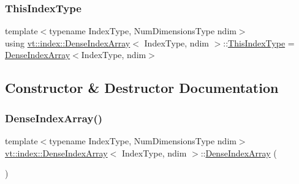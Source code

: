 \mbox{\label{structvt_1_1index_1_1_dense_index_array_a6915511f6a82dff2522d6e8c2be20f2a}} 
\subsubsection{\texorpdfstring{This\+Index\+Type}{ThisIndexType}}
{\footnotesize\ttfamily template$<$typename Index\+Type, Num\+Dimensions\+Type ndim$>$ \\
using \hyperlink{structvt_1_1index_1_1_dense_index_array}{vt\+::index\+::\+Dense\+Index\+Array}$<$ Index\+Type, ndim $>$\+::\hyperlink{structvt_1_1index_1_1_dense_index_array_a6915511f6a82dff2522d6e8c2be20f2a}{This\+Index\+Type} =  \hyperlink{structvt_1_1index_1_1_dense_index_array}{Dense\+Index\+Array}$<$Index\+Type, ndim$>$}



\subsection{Constructor \& Destructor Documentation}
\mbox{\label{structvt_1_1index_1_1_dense_index_array_afcd3d27f0c86b6c37540ae78f9afc2d1}} 
\subsubsection{\texorpdfstring{Dense\+Index\+Array()}{DenseIndexArray()}\hspace{0.1cm}{\footnotesize\ttfamily [1/6]}}
{\footnotesize\ttfamily template$<$typename Index\+Type, Num\+Dimensions\+Type ndim$>$ \\
\hyperlink{structvt_1_1index_1_1_dense_index_array}{vt\+::index\+::\+Dense\+Index\+Array}$<$ Index\+Type, ndim $>$\+::\hyperlink{structvt_1_1index_1_1_dense_index_array}{Dense\+Index\+Array} (\begin{DoxyParamCaption}{ }\end{DoxyParamCaption})\hspace{0.3cm}{\ttfamily [default]}}

